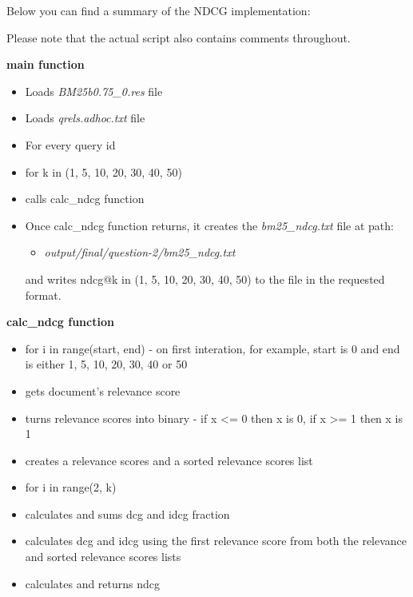 \documentclass{article} %
\begin{document}
Below you can find a summary of the NDCG implementation:

Please note that the actual script also contains comments throughout.

\textbf{main function}

\begin{itemize}
    \item Loads \textit{BM25b0.75\_0.res} file
    \item Loads \textit{qrels.adhoc.txt} file
    \item For every query id
    \item for k in (1, 5, 10, 20, 30, 40, 50)
    \item calls calc\_ndcg function
    \item Once calc\_ndcg function returns, it creates the \textit{bm25\_ndcg.txt} file at path:   
    \begin{itemize}
        \item \textit{output/final/question-2/bm25\_ndcg.txt}
    \end{itemize}
    and writes ndcg@k in (1, 5, 10, 20, 30, 40, 50) to the file in the requested format.
\end{itemize}

\textbf{calc\_ndcg function}

\begin{itemize}
    \item for i in range(start, end) - on first interation, for example, start is 0 and end is either 1, 5, 10, 20, 30, 40 or 50
    \item gets document's relevance score
    \item turns relevance scores into binary - if x \textless= 0 then x is 0, if x \textgreater= 1 then x is 1
    \item creates a relevance scores and a sorted relevance scores list
    \item for i in range(2, k)
    \item calculates and sums dcg and idcg fraction
    \item calculates dcg and idcg using the first relevance score from both the relevance and sorted relevance scores lists
    \item calculates and returns ndcg
\end{itemize}
\end{document}
